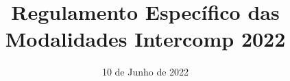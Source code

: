 \documentclass[11pt]{report}
\title{Regulamento Específico das Modalidades Intercomp 2022}
\date{10 de Junho de 2022}
\begin{document}





\noindent
\tableofcontents
\newpage


























\end{document}
